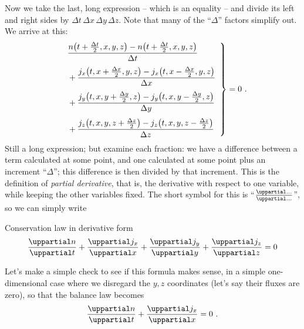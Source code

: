 \documentclass[a4paper,12pt,%
onecolumn,oneside,titlepage,%
british%
]{memoir}
\newcommand*{\de}{\uppartial}%
\newcommand*{\incr}{\Delta}%
\renewcommand*{\|}[1][]{\nonscript\:#1\vert\nonscript\:\mathopen{}}
\newcommand*{\Dt}{\incr t}
\newcommand*{\Dx}{\incr x}
\newcommand*{\Dy}{\incr y}
\newcommand*{\Dz}{\incr z}
\newcommand*{\Dth}{\tfrac{\incr t}{2}}
\newcommand*{\Dxh}{\tfrac{\incr x}{2}}
\newcommand*{\Dyh}{\tfrac{\incr y}{2}}
\newcommand*{\Dzh}{\tfrac{\incr z}{2}}
\begin{document}
Now we take the last, long expression -- which is an equality -- and divide its left and right sides by $\Dt\,\Dx\,\Dy\,\Dz$. Note that many of the \enquote{$\incr$} factors simplify out. We arrive at this:
\begin{equation*}
  \label{eq:balance_deriv_incr}
  \left.\begin{aligned}
      &\frac{n\bigl(t+\Dth, x,y,z\bigr)
      -n\bigl(t+\Dth, x,y,z\bigr)}{\Dt}
      \\[\jot]\quad&+\frac{j_{x}\bigl(t, x+\Dxh, y, z\bigr) - j_{x}\bigl(t, x-\Dxh, y, z\bigr)}{\Dx}
      \\[\jot]\quad&+\frac{j_{y}\bigl(t, x, y+\Dyh, z\bigr) - j_{y}\bigl(t, x, y-\Dyh, z\bigr)}{\Dy}
      \\[\jot]\quad&+\frac{j_{z}\bigl(t, x,y,z+\Dzh\bigr) - j_{z}\bigl(t, x,y,z-\Dzh\bigr)}{\Dz}
    \end{aligned}\enspace\right\}=0 \ .
\end{equation*}
Still a long expression; but examine each fraction: we have a difference between a term calculated at some point, and one calculated at some point plus an increment \enquote{${}\incr$}; this difference is then divided by that increment. This is the definition of \emph{partial derivative}, that is, the derivative with respect to one variable, while keeping the other variables fixed. The short symbol for this is \enquote{$\frac{\de\dotso}{\de\dotso}$}, so we can simply write
\begin{definition}{Conservation law in derivative form}
  \begin{equation}
    \label{eq:balance_deriv}
    \frac{\de n}{\de t}%
    +\frac{\de j_{x}}{\de x}%
    +\frac{\de j_{y}}{\de y}%
    +\frac{\de j_{z}}{\de z}%
    = 0
  \end{equation}
\end{definition}
Let's make a simple check to see if this formula makes sense, in a simple one-dimensional case where we disregard the $y,z$ coordinates (let's say their fluxes are zero), so that the balance law becomes
\begin{equation*}
  \frac{\de n}{\de t} + \frac{\de j_{x}}{\de x} = 0 \ .
\end{equation*}
\end{document}
